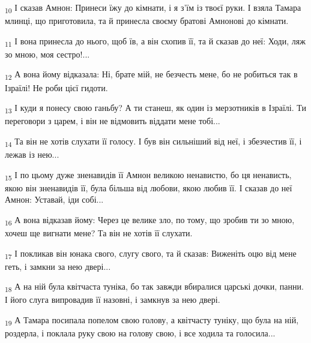 \begin{tcolorbox}
\textsubscript{10} І сказав Амнон: Принеси їжу до кімнати, і я з'їм із твоєї руки. І взяла Тамара млинці, що приготовила, та й принесла своєму братові Амнонові до кімнати.
\end{tcolorbox}
\begin{tcolorbox}
\textsubscript{11} І вона принесла до нього, щоб їв, а він схопив її, та й сказав до неї: Ходи, ляж зо мною, моя сестро!...
\end{tcolorbox}
\begin{tcolorbox}
\textsubscript{12} А вона йому відказала: Ні, брате мій, не безчесть мене, бо не робиться так в Ізраїлі! Не роби цієї гидоти.
\end{tcolorbox}
\begin{tcolorbox}
\textsubscript{13} І куди я понесу свою ганьбу? А ти станеш, як один із мерзотників в Ізраїлі. Ти переговори з царем, і він не відмовить віддати мене тобі...
\end{tcolorbox}
\begin{tcolorbox}
\textsubscript{14} Та він не хотів слухати її голосу. І був він сильніший від неї, і збезчестив її, і лежав із нею...
\end{tcolorbox}
\begin{tcolorbox}
\textsubscript{15} І по цьому дуже зненавидів її Амнон великою ненавистю, бо ця ненависть, якою він зненавидів її, була більша від любови, якою любив її. І сказав до неї Амнон: Уставай, іди собі...
\end{tcolorbox}
\begin{tcolorbox}
\textsubscript{16} А вона відказав йому: Через це велике зло, по тому, що зробив ти зо мною, хочеш ще вигнати мене? Та він не хотів її слухати.
\end{tcolorbox}
\begin{tcolorbox}
\textsubscript{17} І покликав він юнака свого, слугу свого, та й сказав: Виженіть оцю від мене геть, і замкни за нею двері...
\end{tcolorbox}
\begin{tcolorbox}
\textsubscript{18} А на ній була квітчаста туніка, бо так завжди вбиралися царські дочки, панни. І його слуга випровадив її назовні, і замкнув за нею двері.
\end{tcolorbox}
\begin{tcolorbox}
\textsubscript{19} А Тамара посипала попелом свою голову, а квітчасту туніку, що була на ній, роздерла, і поклала руку свою на голову свою, і все ходила та голосила...
\end{tcolorbox}
